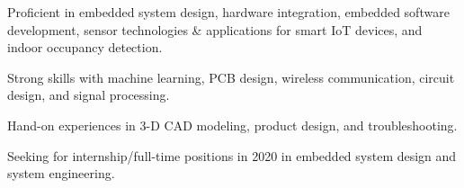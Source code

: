 

\begin{cvparagraph}

    \vspace{12pt}
\begin{cvitems}
    \setlength{\itemsep}{2pt}
    \item Proficient in embedded system design, hardware integration, embedded software development, sensor technologies \& applications for smart IoT devices, and indoor occupancy detection.
    \item Strong skills with machine learning, PCB design, wireless communication, circuit design, and signal processing.
    \item Hand-on experiences in 3-D CAD modeling, product design, and troubleshooting.
    \item Seeking for internship/full-time positions in 2020 in embedded system design and system engineering.
\end{cvitems}
\end{cvparagraph}
